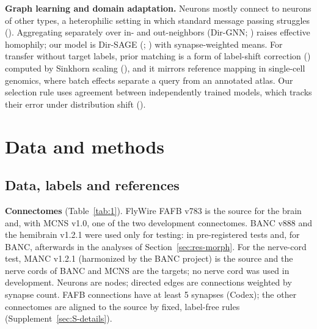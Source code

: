 \documentclass[11pt,a4paper]{article}
\begin{document}
\textbf{Graph learning and domain adaptation.} Neurons mostly connect to neurons of other types, a heterophilic setting in which standard message passing struggles (\citealp{zhu2020}). Aggregating separately over in- and out-neighbors (Dir-GNN; \citealp{rossi2023}) raises effective homophily; our model is Dir-SAGE (\citealp{hamilton2017}; \citealp{rossi2023}) with synapse-weighted means. For transfer without target labels, prior matching is a form of label-shift correction (\citealp{saerens2002}) computed by Sinkhorn scaling (\citealp{cuturi2013}), and it mirrors reference mapping in single-cell genomics, where batch effects separate a query from an annotated atlas. Our selection rule uses agreement between independently trained models, which tracks their error under distribution shift (\citealp{jiang2022}).

\section{Data and methods}\label{sec:methods}

\subsection{Data, labels and references}\label{sec:data}

\textbf{Connectomes} (Table~\ref{tab:1}). FlyWire FAFB v783 is the source for the brain and, with MCNS v1.0, one of the two development connectomes. BANC v888 and the hemibrain v1.2.1 were used only for testing: in pre-registered tests and, for BANC, afterwards in the analyses of Section~\ref{sec:res-morph}. For the nerve-cord test, MANC v1.2.1 (harmonized by the BANC project) is the source and the nerve cords of BANC and MCNS are the targets; no nerve cord was used in development. Neurons are nodes; directed edges are connections weighted by synapse count. FAFB connections have at least 5 synapses (Codex); the other connectomes are aligned to the source by fixed, label-free rules (Supplement~\ref{sec:S-details}).
\end{document}
